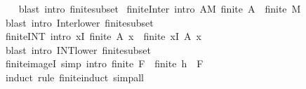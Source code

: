 \begin{isabellebody}
%
\isadelimproof
\ \ %
\endisadelimproof
%
\isatagproof
{}\isamarkupfalse%
\ {\isacharparenleft}{\kern0pt}blast\ intro{\isacharcolon}{\kern0pt}\ finite{\isacharunderscore}{\kern0pt}subset{\isacharparenright}{\kern0pt}%
\endisatagproof
{\isafoldproof}%
%
\isadelimproof
\isanewline
%
\endisadelimproof
\isanewline
{}\isamarkupfalse%
\ finite{\isacharunderscore}{\kern0pt}Inter\ {\isacharbrackleft}{\kern0pt}intro{\isacharbrackright}{\kern0pt}{\isacharcolon}{\kern0pt}\ {\isachardoublequoteopen}{\isasymexists}A{\isasymin}M{\isachardot}{\kern0pt}\ finite\ A\ {\isasymLongrightarrow}\ finite\ {\isacharparenleft}{\kern0pt}{\isasymInter}M{\isacharparenright}{\kern0pt}{\isachardoublequoteclose}\isanewline
%
\isadelimproof
\ \ %
\endisadelimproof
%
\isatagproof
{}\isamarkupfalse%
\ {\isacharparenleft}{\kern0pt}blast\ intro{\isacharcolon}{\kern0pt}\ Inter{\isacharunderscore}{\kern0pt}lower\ finite{\isacharunderscore}{\kern0pt}subset{\isacharparenright}{\kern0pt}%
\endisatagproof
{\isafoldproof}%
%
\isadelimproof
\isanewline
%
\endisadelimproof
\isanewline
{}\isamarkupfalse%
\ finite{\isacharunderscore}{\kern0pt}INT\ {\isacharbrackleft}{\kern0pt}intro{\isacharbrackright}{\kern0pt}{\isacharcolon}{\kern0pt}\ {\isachardoublequoteopen}{\isasymexists}x{\isasymin}I{\isachardot}{\kern0pt}\ finite\ {\isacharparenleft}{\kern0pt}A\ x{\isacharparenright}{\kern0pt}\ {\isasymLongrightarrow}\ finite\ {\isacharparenleft}{\kern0pt}{\isasymInter}x{\isasymin}I{\isachardot}{\kern0pt}\ A\ x{\isacharparenright}{\kern0pt}{\isachardoublequoteclose}\isanewline
%
\isadelimproof
\ \ %
\endisadelimproof
%
\isatagproof
{}\isamarkupfalse%
\ {\isacharparenleft}{\kern0pt}blast\ intro{\isacharcolon}{\kern0pt}\ INT{\isacharunderscore}{\kern0pt}lower\ finite{\isacharunderscore}{\kern0pt}subset{\isacharparenright}{\kern0pt}%
\endisatagproof
{\isafoldproof}%
%
\isadelimproof
\isanewline
%
\endisadelimproof
\isanewline
{}\isamarkupfalse%
\ finite{\isacharunderscore}{\kern0pt}imageI\ {\isacharbrackleft}{\kern0pt}simp{\isacharcomma}{\kern0pt}\ intro{\isacharbrackright}{\kern0pt}{\isacharcolon}{\kern0pt}\ {\isachardoublequoteopen}finite\ F\ {\isasymLongrightarrow}\ finite\ {\isacharparenleft}{\kern0pt}h\ {\isacharbackquote}{\kern0pt}\ F{\isacharparenright}{\kern0pt}{\isachardoublequoteclose}\isanewline
%
\isadelimproof
\ \ %
\endisadelimproof
%
\isatagproof
{}\isamarkupfalse%
\ {\isacharparenleft}{\kern0pt}induct\ rule{\isacharcolon}{\kern0pt}\ finite{\isacharunderscore}{\kern0pt}induct{\isacharparenright}{\kern0pt}\ simp{\isacharunderscore}{\kern0pt}all%

\end{isabellebody}
